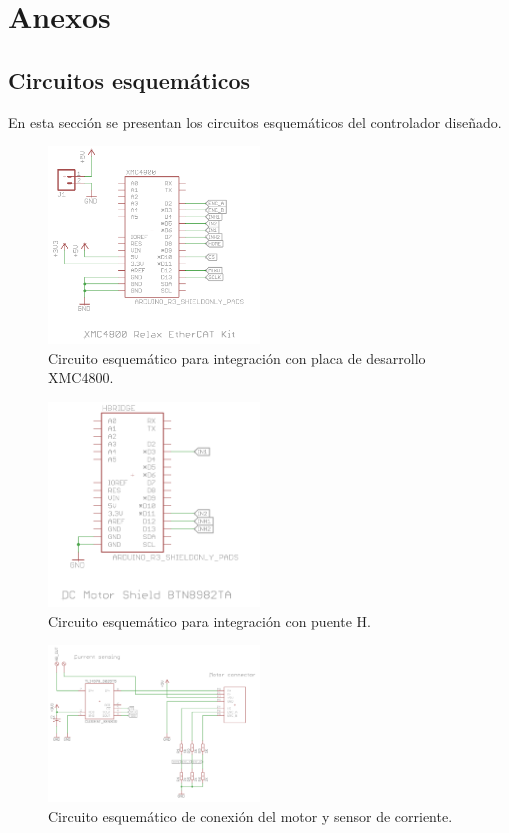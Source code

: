 \chapter{Anexos}

\section{Circuitos esquemáticos}\label{anexo_esq}

En esta sección se presentan los circuitos esquemáticos del controlador diseñado.

\begin{figure}[ht]
  \centering
  \includegraphics[width=0.5\textwidth]{img/anexo/xmc4800_schematic}
  \caption{Circuito esquemático para integración con placa de desarrollo XMC4800.}
  \label{anexo_esq_xmc4800}
\end{figure}

\begin{figure}[ht]
  \centering
  \includegraphics[width=0.5\textwidth]{img/anexo/puente_h_schematic}
  \caption{Circuito esquemático para integración con puente H.}
  \label{anexo_esq_puente_h}
\end{figure}


\begin{figure}[ht]
  \centering
  \includegraphics[width=0.5\textwidth]{img/anexo/current_sensor_schematic}
  \caption{Circuito esquemático de conexión del motor y sensor de corriente.}
  \label{anexo_esq_motor}
\end{figure}


